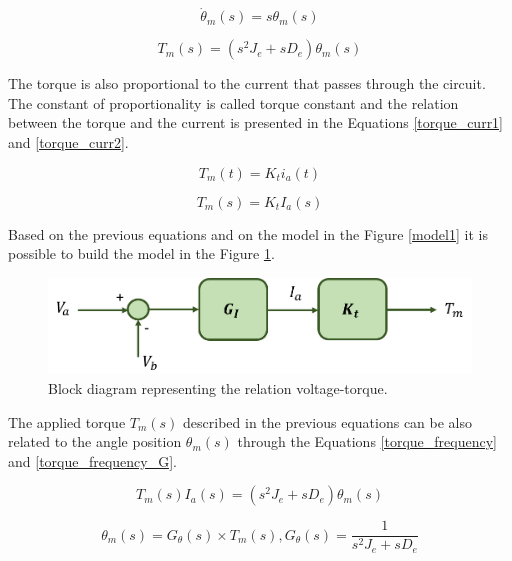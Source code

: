 \begin{equation}\label{theta_relation}
\dot{\theta}_{m}(s)= s\theta_{m}(s)
\end{equation}

\begin{equation}\label{torque_frequency_theta}
T_{m}(s)= (s^{2}J_{e} + sD_{e})\theta_{m}(s)
\end{equation}

The torque is also proportional to the current that passes through the circuit. The constant of proportionality is called torque constant and the relation between the torque and the current is presented in the Equations \ref{torque_curr1} and \ref{torque_curr2}.

\begin{equation}\label{torque_curr1}
T_{m}(t)= K_{t} i_{a}(t)
\end{equation}

\begin{equation}\label{torque_curr2}
T_{m}(s)= K_{t} I_{a}(s)
\end{equation}

Based on the previous equations and on the model in the Figure \ref{model1} it is possible to build the model in the Figure \ref{model2}.

\begin{figure}[H]
\centering
\includegraphics[scale=0.6]{figures/model2.png}
\caption{Block diagram representing the relation voltage-torque.}
\label{model2}
\end{figure}

The applied torque $T_{m}(s)$ described in the previous equations can be also related to the angle position $\theta_{m}(s)$ through the Equations \ref{torque_frequency} and \ref{torque_frequency_G}.

\begin{equation}\label{torque_frequency}
T_{m}(s) I_{a}(s)= (s^{2}J_{e} + sD_{e})\theta_{m}(s)
\end{equation}

\begin{equation}\label{torque_frequency_G}
\theta_{m}(s)= G_{\theta}(s)\times T_{m}(s) , G_{\theta}(s)=\frac{1}{s^{2}J_{e} + sD_{e}}
\end{equation}

